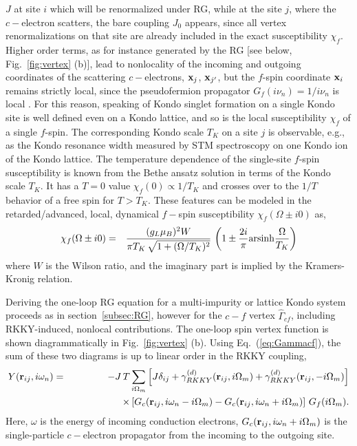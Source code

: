 \documentclass[12pt,twoside]{article}
\begin{document}
$J$ at site $i$ which will be renormalized under RG, 
while at the site $j$, where the $c-$electron scatters, the bare 
coupling $J_0$ appears, since all vertex renormalizations on that 
site are already included in the exact susceptibility $\chi_f$. 
Higher order terms, as for instance generated by the RG
[see below, Fig.~\ref{fig:vertex} (b)], lead to nonlocality of the incoming 
and outgoing coordinates of the scattering $c-$electrons, 
${\bf x}_{j}$, ${\bf x}_{j'}$, but the $f$-spin coordinate ${\bf x}_i$ 
remains strictly local, since the pseudofermion propagator 
$G_f(i\nu_n)=1/i\nu_n$ is local \cite{Kroha98}. 
For this reason, speaking of Kondo singlet formation on 
a single Kondo site is well defined even on a Kondo lattice, and so is 
the local susceptibility $\chi_f$ of a single $f$-spin.
The corresponding Kondo scale $T_K$ on a site $j$ is observable, 
e.g., as the Kondo resonance width measured by STM spectroscopy on one Kondo 
ion of the Kondo lattice.
The temperature dependence of the single-site $f$-spin susceptibility 
is known from the Bethe ansatz solution \cite{Andrei83} in terms of the 
Kondo scale $T_K$.  It has a 
$T=0$ value $\chi_f(0)\propto 1/T_K$ and crosses over to the $1/T$ 
behavior of a free spin for $T>T_K$. These features can be 
modeled in the retarded/advanced, local, dynamical  
$f-$spin susceptibility $\chi_f(\Omega\pm i0)$ as,
\begin{eqnarray}
\chi_f(\Omega \pm i0) &=& \frac{(g_L\mu_B)^2W}{\pi T_K\,\sqrt{1+(\Omega/T_K)^2}}\, 
\left( 1 \pm \frac{2i}{\pi} {\rm arsinh} \frac{\Omega}{T_K} \right)
\label{eq:chif_ret}
\end{eqnarray} 
where $W$ is the Wilson ratio, and the imaginary part is implied by the 
Kramers-Kronig relation. 

Deriving the one-loop RG equation for a multi-impurity or lattice 
Kondo system proceeds as in section~\ref{subsec:RG}, however for 
the $c-f$ vertex $\hat\Gamma_{cf}$, including RKKY-induced, nonlocal 
contributions. The one-loop spin vertex function is shown diagrammatically 
in Fig.~\ref{fig:vertex} (b). Using Eq.~(\ref{eq:Gammacf}), the sum of these
two diagrams is up to linear order in the RKKY coupling, 
\begin{eqnarray}
Y({\bf r}_{ij}, i\omega_n ) &=&   \label{eq:Yx}   
-J \, T \sum_{i\Omega_m}   
\left[  J\delta_{ij} +
\gamma^{(d)}_{RKKY}({\bf{r}}_{ij},i\Omega_m)+\gamma^{(d)}_{RKKY}({\bf{r}}_{ij},-i\Omega_m)
\right]  \\
&&\hspace*{+1.8cm}
\times 
\left[ 
G_c({\bf r}_{ij}, i\omega_n -i\Omega_m )-G_c({\bf r}_{ij}, i\omega_n + i\Omega_m)
\right]\, G_f(i\Omega_m). 
\nonumber
\end{eqnarray}
Here, $\omega$ is the energy of incoming conduction electrons,    
$G_c({\bf r}_{ij}, i\omega_n + i\Omega_m)$ is the single-particle 
$c-$electron propagator from the incoming to the outgoing site. 
\end{document}
